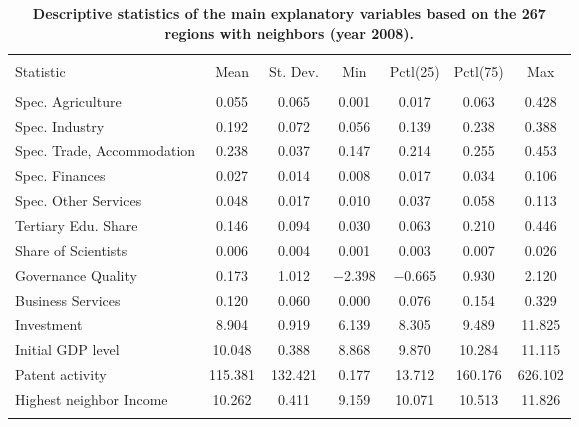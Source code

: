 \documentclass[11pt]{article}
\begin{document}
\begin{table}[!htbp] \centering 
  \caption{\textbf{Descriptive statistics of the main explanatory variables based on the 267 regions with neighbors (year 2008).}} 
  \label{descriptive_vars_filtered} 
\begin{tabular}{@{\extracolsep{5pt}}lcccccc} 
\\[-1.8ex]\hline 
\hline \\[-1.8ex] 
Statistic  & \multicolumn{1}{c}{Mean} & \multicolumn{1}{c}{St. Dev.} & \multicolumn{1}{c}{Min} & \multicolumn{1}{c}{Pctl(25)} & \multicolumn{1}{c}{Pctl(75)} & \multicolumn{1}{c}{Max} \\ 
\hline \\[-1.8ex] 
Spec. Agriculture & 0.055 & 0.065 & 0.001 & 0.017 & 0.063 & 0.428 \\ 
Spec. Industry  & 0.192 & 0.072 & 0.056 & 0.139 & 0.238 & 0.388 \\ 
Spec. Trade, Accommodation  & 0.238 & 0.037 & 0.147 & 0.214 & 0.255 & 0.453 \\ 
Spec. Finances  & 0.027 & 0.014 & 0.008 & 0.017 & 0.034 & 0.106 \\ 
Spec. Other Services & 0.048 & 0.017 & 0.010 & 0.037 & 0.058 & 0.113 \\ 
Tertiary Edu. Share & 0.146 & 0.094 & 0.030 & 0.063 & 0.210 & 0.446 \\ 
Share of Scientists & 0.006 & 0.004 & 0.001 & 0.003 & 0.007 & 0.026 \\ 
Governance Quality & 0.173 & 1.012 & $-$2.398 & $-$0.665 & 0.930 & 2.120 \\  
Business Services & 0.120 & 0.060 & 0.000 & 0.076 & 0.154 & 0.329 \\ 
Investment & 8.904 & 0.919 & 6.139 & 8.305 & 9.489 & 11.825 \\  
Initial GDP level & 10.048 & 0.388 & 8.868 & 9.870 & 10.284 & 11.115 \\ 
Patent activity  & 115.381 & 132.421 & 0.177 & 13.712 & 160.176 & 626.102 \\ 
Highest neighbor Income & 10.262 & 0.411 & 9.159 & 10.071 & 10.513 & 11.826 \\ 
\hline \\[-1.8ex] 
\end{tabular} 
\end{table} 
\end{document}
